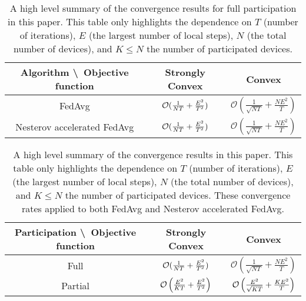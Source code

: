 \begin{table}[h!]
\centering
\begin{tabular}{|c|c|c|}\hline 
	Algorithm \textbackslash\  Objective function        & Strongly Convex        & Convex \\ \hline \hline
	FedAvg                         & ${\mathcal{O}}(\frac{1}{NT}+\frac{E^{2}}{T^{2}})$    &  $\mathcal{O}\left(\frac{1}{\sqrt{NT}}+\frac{NE^{2}}{T}\right)$       \\ \hline
	Nesterov accelerated FedAvg    & ${\mathcal{O}}(\frac{1}{NT}+\frac{E^{2}}{T^{2}})$    & $\mathcal{O}\left(\frac{1}{\sqrt{NT}}+\frac{NE^{2}}{T}\right)$       \\ \hline
\end{tabular}
\caption{A high level summary of the convergence results for full participation in this paper. This table only highlights the
dependence on $T$ (number of iterations), $E$ (the largest number of local steps), $N$ (the total number of devices), and $K\leq N$ the number of participated devices.}
\label{tb:convergenceratev1}
\end{table}

\begin{table}[h!]
\centering
\begin{tabular}{|c|c|c|}\hline 
	Participation \textbackslash\ Objective function            & Strongly Convex        & Convex \\ \hline \hline
	Full                         & ${\mathcal{O}}(\frac{1}{NT}+\frac{E^{2}}{T^{2}})$    &  $\mathcal{O}\left(\frac{1}{\sqrt{NT}}+\frac{NE^{2}}{T}\right)$       \\ \hline
	Partial                      &  ${\mathcal{O}}\left(\frac{E^{2}}{KT}+\frac{E^{2}}{T^{2}}\right)$   &  ${\mathcal{O}}\left(\frac{E^2}{\sqrt{KT}}+\frac{KE^2}{T} \right)$      \\ \hline
\end{tabular}
\caption{A high level summary of the convergence results in this paper. This table only highlights the
dependence on $T$ (number of iterations), $E$ (the largest number of local steps), $N$ (the total number of devices), and $K\leq N$ the number of participated devices.
These convergence rates applied to both FedAvg and Nesterov accelerated FedAvg.}
\label{tb:convergenceratev2}
\end{table}


